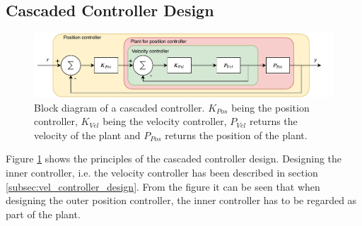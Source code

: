 \documentclass[../../main.tex]{subfiles}
\begin{document}


\subsection{Cascaded Controller Design}
\begin{figure}[]
    \centering
    \includegraphics[width = 0.7 \textwidth]{Sections/System_Design/Images/cascade_controller.pdf}
    \caption{Block diagram of a cascaded controller. $K_{Pos}$ being the position controller, $K_{Vel}$ being the velocity controller, $P_{Vel}$ returns the velocity of the plant and $P_{Pos}$ returns the position of the plant.}
    \label{fig:cascaded_design}
\end{figure}
Figure \ref{fig:cascaded_design} shows the principles of the cascaded controller design. Designing the inner controller, i.e. the velocity controller has been described in section \ref{subsec:vel_controller_design}. From the figure it can be seen that when designing the outer position controller, the inner controller has to be regarded as part of the plant. 
\end{document}
